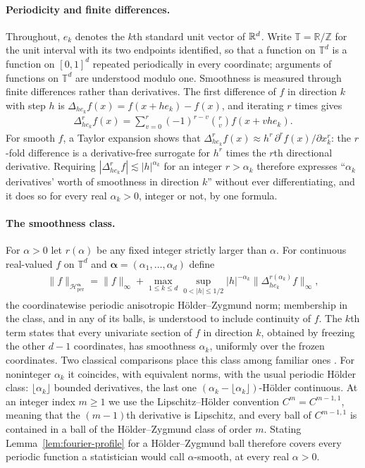 \paragraph*{Periodicity and finite differences.}
Throughout, $e_k$ denotes the $k$th standard unit vector of $\mathbb{R}^d$. Write $\mathbb T=\mathbb R/\mathbb Z$ for the unit interval with its two endpoints identified, so that a function on $\mathbb T^d$ is a function on $[0,1]^d$ repeated periodically in every coordinate; arguments of functions on $\mathbb T^d$ are understood modulo one. Smoothness is measured through finite differences rather than derivatives. The first difference of $f$ in direction $k$ with step $h$ is $\Delta_{he_k}f(x)=f(x+he_k)-f(x)$, and iterating $r$ times gives
\begin{align*}
\Delta_{he_k}^{r}f(x)
=\sum_{v=0}^{r}(-1)^{r-v}\binom{r}{v}f(x+vhe_k).
\end{align*}
For smooth $f$, a Taylor expansion shows that $\Delta_{he_k}^{r}f(x)\approx h^r\,\partial^rf(x)/\partial x_k^r$: the $r$-fold difference is a derivative-free surrogate for $h^r$ times the $r$th directional derivative. Requiring $|\Delta_{he_k}^{r}f|\lesssim|h|^{\alpha_k}$ for an integer $r>\alpha_k$ therefore expresses ``$\alpha_k$ derivatives' worth of smoothness in direction $k$'' without ever differentiating, and it does so for every real $\alpha_k>0$, integer or not, by one formula.

\paragraph*{The smoothness class.}
For $\alpha>0$ let $r(\alpha)$ be any fixed integer strictly larger than $\alpha$. For continuous real-valued $f$ on $\mathbb T^d$ and $\boldsymbol\alpha=(\alpha_1,\ldots,\alpha_d)$ define
\begin{align*}
\|f\|_{\mathcal H_{\mathrm{per}}^{\boldsymbol\alpha}}
=\|f\|_\infty+
\max_{1\leq k\leq d}\sup_{0<|h|\leq1/2}
|h|^{-\alpha_k}\|\Delta_{he_k}^{r(\alpha_k)}f\|_\infty,
\end{align*}
the coordinatewise periodic anisotropic H\"older--Zygmund norm; membership in the class, and in any of its balls, is understood to include continuity of $f$. The $k$th term states that every univariate section of $f$ in direction $k$, obtained by freezing the other $d-1$ coordinates, has smoothness $\alpha_k$, uniformly over the frozen coordinates. Two classical comparisons place this class among familiar ones \citep{Zygmund2002}. For noninteger $\alpha_k$ it coincides, with equivalent norms, with the usual periodic H\"older class: $\lfloor\alpha_k\rfloor$ bounded derivatives, the last one $(\alpha_k-\lfloor\alpha_k\rfloor)$-H\"older continuous. At an integer index $m\geq1$ we use the Lipschitz--H\"older convention $C^m=C^{m-1,1}$, meaning that the $(m-1)$th derivative is Lipschitz, and every ball of $C^{m-1,1}$ is contained in a ball of the H\"older--Zygmund class of order $m$. Stating Lemma~\ref{lem:fourier-profile} for a H\"older--Zygmund ball therefore covers every periodic function a statistician would call $\alpha$-smooth, at every real $\alpha>0$.

